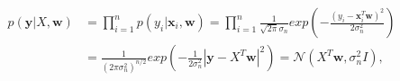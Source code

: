 \begin{equation}
\label{eq:likelihoodcontinuous}
\begin{align*}
p(\mathbf{y} | X, \mathbf{w}) &= \prod_{i = 1}^{n} {p(y_i | \mathbf{x}_i,
\mathbf{w})} = \prod_{i = 1}^{n} {\frac{1}{\sqrt{2\pi} \sigma_n} 
exp \left(- \frac{(y_i - \mathbf{x}_i^T \mathbf{w})^2}{2 \sigma_n^2} \right)} \\
&= \frac{1}{(2\pi \sigma_n^2)^{n/2}} exp \left(- \frac{1}{2 \sigma_n^2}
|\mathbf{y} - X^T \mathbf{w}|^2 \right) = \mathcal{N}(X^T \mathbf{w}, \sigma_n^2
I), 
\end{align*}
\end{equation}